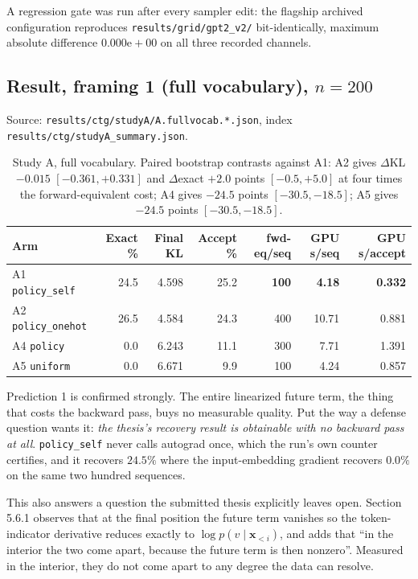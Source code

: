 \documentclass[11pt,a4paper]{article}
\newcommand{\vx}{\bm{x}}
\newcommand{\file}[1]{\texttt{\small #1}}
\begin{document}
A regression gate was run after every sampler edit: the flagship archived configuration
reproduces \file{results/grid/gpt2\_v2/} bit-identically, maximum absolute difference
$0.000\mathrm{e}{+}00$ on all three recorded channels.

\subsection{Result, framing 1 (full vocabulary), $n=200$}

Source: \file{results/ctg/studyA/A.fullvocab.*.json}, index
\file{results/ctg/studyA\_summary.json}.

\begin{table}[htbp]
\centering
\begin{tabular}{lrrrrrr}
\toprule
Arm & Exact \% & Final KL & Accept \% & fwd-eq/seq & GPU s/seq & GPU s/accept \\
\midrule
A1 \texttt{policy\_self}   & 24.5 & 4.598 & 25.2 & \textbf{100} & \textbf{4.18} & \textbf{0.332} \\
A2 \texttt{policy\_onehot} & 26.5 & 4.584 & 24.3 & 400 & 10.71 & 0.881 \\
A4 \texttt{policy}         &  0.0 & 6.243 & 11.1 & 300 &  7.71 & 1.391 \\
A5 \texttt{uniform}        &  0.0 & 6.671 &  9.9 & 100 &  4.24 & 0.857 \\
\bottomrule
\end{tabular}
\caption{Study A, full vocabulary. Paired bootstrap contrasts against A1:
A2 gives $\Delta$KL $-0.015$ $[-0.361,+0.331]$ and $\Delta$exact $+2.0$ points
$[-0.5,+5.0]$ at four times the forward-equivalent cost; A4 gives $-24.5$ points
$[-30.5,-18.5]$; A5 gives $-24.5$ points $[-30.5,-18.5]$.}
\end{table}

Prediction 1 is confirmed strongly. The entire linearized future term, the thing that
costs the backward pass, buys no measurable quality. Put the way a defense question
wants it: \emph{the thesis's recovery result is obtainable with no backward pass at
all}. \texttt{policy\_self} never calls autograd once, which the run's own counter
certifies, and it recovers $24.5\%$ where the input-embedding gradient recovers $0.0\%$
on the same two hundred sequences.

This also answers a question the submitted thesis explicitly leaves open. Section 5.6.1
observes that at the final position the future term vanishes so the token-indicator
derivative reduces exactly to $\log p(v \mid \vx_{<i})$, and adds that ``in the interior
the two come apart, because the future term is then nonzero''. Measured in the interior,
they do not come apart to any degree the data can resolve.
\end{document}
